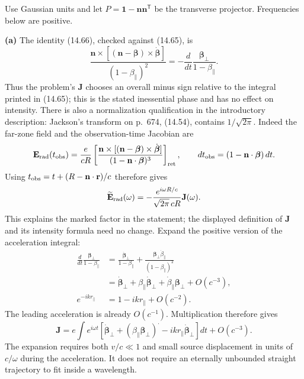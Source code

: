 Use Gaussian units and let $P=\mathbf 1-\mathbf n\mathbf n^{\mathsf T}$
be the transverse projector.  Frequencies below are positive.

\medskip\noindent\textbf{(a)} The identity (14.66), checked against
(14.65), is
\[
\frac{\mathbf n\times[(\mathbf n-\boldsymbol\beta)\times
 \dot{\boldsymbol\beta}]}{(1-\beta_\parallel)^2}
=-\frac d{dt}\frac{\boldsymbol\beta_\perp}{1-\beta_\parallel}.
\]
Thus the problem's $\mathbf J$ chooses an overall minus sign relative
to the integral printed in (14.65); this is the stated inessential
phase and has no effect on intensity.  There is also a normalization
qualification in the introductory description: Jackson's transform
on p.~674, (14.54), contains $1/\sqrt{2\pi}$.  Indeed the far-zone
field and the observation-time Jacobian are
\[
\mathbf E_{\rm rad}(t_{\rm obs})
=\frac e{cR}\left[
 \frac{\mathbf n\times[(\mathbf n-\boldsymbol\beta)\times
 \dot{\boldsymbol\beta}]}{(1-\mathbf n\cdot\boldsymbol\beta)^3}
 \right]_{\rm ret},\qquad
dt_{\rm obs}=(1-\mathbf n\cdot\boldsymbol\beta)\,dt.
\]
Using $t_{\rm obs}=t+(R-\mathbf n\cdot\mathbf r)/c$ therefore gives
\[
\widetilde{\mathbf E}_{\rm rad}(\omega)
=-\frac{e^{i\omega R/c}}{\sqrt{2\pi}\,cR}\mathbf J(\omega).
\]
This explains the marked factor in the statement; the displayed
definition of $\mathbf J$ and its intensity formula need no change.
Expand the positive version of the acceleration integral:
\begin{align*}
\frac d{dt}\frac{\boldsymbol\beta_\perp}{1-\beta_\parallel}
&=\frac{\dot{\boldsymbol\beta}_\perp}{1-\beta_\parallel}
 +\frac{\boldsymbol\beta_\perp\dot\beta_\parallel}
 {(1-\beta_\parallel)^2}\\
&=\dot{\boldsymbol\beta}_\perp+
 \beta_\parallel\dot{\boldsymbol\beta}_\perp+
 \dot\beta_\parallel\boldsymbol\beta_\perp+O(c^{-3}),\\
e^{-ikr_\parallel}&=1-ikr_\parallel+O(c^{-2}).
\end{align*}
The leading acceleration is already $O(c^{-1})$.  Multiplication
therefore gives
\[
\boxed{\mathbf J=e\int e^{i\omega t}
 [\dot{\boldsymbol\beta}_\perp+
 (\beta_\parallel\boldsymbol\beta_\perp)^{\displaystyle\cdot}
 -ikr_\parallel\dot{\boldsymbol\beta}_\perp]dt+O(c^{-3}).}
\]
The expansion requires both $v/c\ll1$ and small source displacement
in units of $c/\omega$ during the acceleration.  It does not require
an eternally unbounded straight trajectory to fit inside a wavelength.

